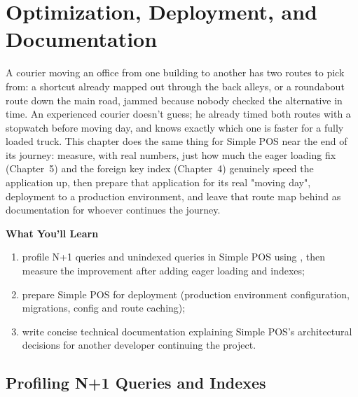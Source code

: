 
\chapter{Optimization, Deployment, and Documentation}
\label{ch:optimasi-dan-deployment}


A courier moving an office from one building to another has two routes
to pick from: a shortcut already mapped out through the back alleys, or
a roundabout route down the main road, jammed because nobody checked
the alternative in time. An experienced courier doesn't guess; he
already timed both routes with a stopwatch before moving day, and knows
exactly which one is faster for a fully loaded truck. This chapter does
the same thing for Simple POS near the end of its journey: measure,
with real numbers, just how much the eager loading fix (Chapter~5) and
the foreign key index (Chapter~4) genuinely speed the application up,
then prepare that application for its real "moving day", deployment to
a production environment, and leave that route map behind as
documentation for whoever continues the journey.

\textbf{What You'll Learn}

\begin{enumerate}
  \item profile N+1 queries and unindexed queries in Simple POS using , then measure the improvement after adding eager loading and indexes;
  \item prepare Simple POS for deployment (production environment configuration, migrations, config and route caching);
  \item write concise technical documentation explaining Simple POS's architectural decisions for another developer continuing the project.
\end{enumerate}

\section{Profiling N+1 Queries and Indexes}
\label{sec:optimasi-dan-deployment-1}

